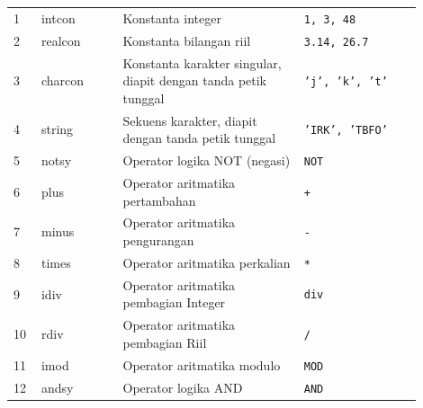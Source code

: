 \begin{center}
\begin{longtable}{p{0.06\linewidth} p{0.18\linewidth} p{0.40\linewidth} p{0.26\linewidth}}
        1  & intcon      & Konstanta integer                                                                                                           & \texttt{1, 3, 48}              \\
        2  & realcon     & Konstanta bilangan riil                                                                                                     & \texttt{3.14, 26.7}            \\
        3  & charcon     & Konstanta karakter singular, diapit dengan tanda petik tunggal                                                              & \texttt{'j', 'k', 't'}         \\
        4  & string      & Sekuens karakter, diapit dengan tanda petik tunggal                                                                         & \texttt{'IRK', 'TBFO'}         \\
        5  & notsy       & Operator logika NOT (negasi)                                                                                                & \texttt{NOT}                   \\
        6  & plus        & Operator aritmatika pertambahan                                                                                             & \texttt{+}                     \\
        7  & minus       & Operator aritmatika pengurangan                                                                                             & \texttt{-}                     \\
        8  & times       & Operator aritmatika perkalian                                                                                               & \texttt{*}                     \\
        9  & idiv        & Operator aritmatika pembagian Integer                                                                                       & \texttt{div}                   \\
        10 & rdiv        & Operator aritmatika pembagian Riil                                                                                          & \texttt{/}                     \\
        11 & imod        & Operator aritmatika modulo                                                                                                  & \texttt{MOD}                   \\
        12 & andsy       & Operator logika AND                                                                                                         & \texttt{AND}                   \\

\end{longtable}
\end{center}
